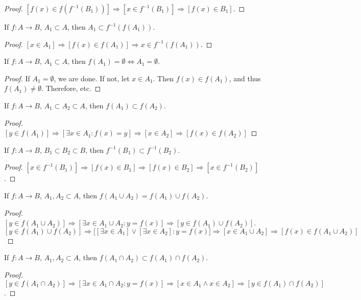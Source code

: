 \documentclass[crop=false,class=book]{standalone}
\begin{document}
\begin{proof}
$[f(x)\in f(f^{-1}(B_1))]\Rightarrow [x\in f^{-1}(B_1)]\Rightarrow [f(x)\in B_1]$.
\end{proof}
\begin{theorem}
If $f:A\rightarrow B$, $A_1\subset A$, then $A_1\subset f^{-1}(f(A_1))$.
\end{theorem}
\begin{proof}
$[x\in A_1]\Rightarrow [f(x) \in f(A_1)]\Rightarrow x\in f^{-1}(f(A_1))$.
\end{proof}
\begin{theorem}
If $f:A\rightarrow B$, $A_1\subset A$, then $f(A_1) = \emptyset \Leftrightarrow A_1 = \emptyset$.
\end{theorem}
\begin{proof}
If $A_1 = \emptyset$, we are done. If not, let $x\in A_1$. Then $f(x)\in f(A_1)$, and thus $f(A_1)\ne \emptyset$. Therefore, etc.
\end{proof}
\begin{corollary}
If $f:A\rightarrow B$, $A_1\subset A_2\subset A$, then $f(A_1)\subset f(A_2)$.
\end{corollary}
\begin{proof}
$[y\in f(A_1)]\Rightarrow[\exists x\in A_1:f(x)=y]\Rightarrow [x\in A_2] \Rightarrow [f(x)\in f(A_2)]$
\end{proof}
\begin{corollary}
If $f:A\rightarrow B$, $B_1\subset B_2\subset B$, then $f^{-1}(B_1)\subset f^{-1}(B_2)$.
\end{corollary}
\begin{proof}
$[x\in f^{-1}(B_1)] \Rightarrow [f(x) \in B_1] \Rightarrow [f(x) \in B_2]\Rightarrow [x\in f^{-1}(B_2)]$.
\end{proof}
\begin{theorem}
If $f:A\rightarrow B$, $A_1,A_2\subset A$, then $f(A_1 \cup A_2) = f(A_1)\cup f(A_2)$.
\end{theorem}
\begin{proof}
$[y\in f(A_1\cup A_2)]\Rightarrow [\exists x\in A_1 \cup A_2:y=f(x)]\Rightarrow [y \in f(A_1)\cup f(A_2)]$. $[y\in f(A_1)\cup f(A_2)]\Rightarrow \big[[\exists x\in A_1] \lor [\exists x\in A_2]: y=f(x)\big]\Rightarrow [x\in A_1\cup A_2]\Rightarrow [f(x)\in f(A_1\cup A_2)]$
\end{proof}
\begin{theorem}
If $f:A\rightarrow B$, $A_1,A_2\subset A$, then $f(A_1\cap A_2)\subset f(A_1)\cap f(A_2)$.
\end{theorem}
\begin{proof}
$[y\in f(A_1 \cap A_2)]\Rightarrow [\exists x\in A_1 \cap A_2:y=f(x)]\Rightarrow [x\in A_1 \land x \in A_2] \Rightarrow[y \in f(A_1)\cap f(A_2)]$.
\end{proof}
\end{document}
